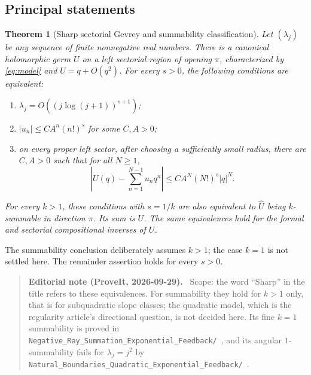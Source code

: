 \documentclass[11pt,a4paper]{article}
\numberwithin{equation}{section}
\newtheorem{theorem}{Theorem}[section]
\theoremstyle{definition}\newtheorem{definition}[theorem]{Definition}
\theoremstyle{remark}\newtheorem{remark}[theorem]{Remark}
\newcommand{\Uhat}{\widehat U}\newcommand{\Qhat}{\widehat Q}\newcommand{\Vhat}{\widehat V}
\newenvironment{ednote}{\par\smallskip\begin{quote}\small\raggedright\textbf{Editorial note (ProveIt, 2026-09-29).}\ }{\end{quote}\smallskip}
\begin{document}
\subsection{Principal statements}
\begin{theorem}[Sharp sectorial Gevrey and summability classification]
\label{thm:headline}
Let $(\lambda_j)$ be any sequence of finite nonnegative real numbers.
There is a canonical holomorphic germ $U$ on a left sectorial region of
opening $\pi$, characterized by \eqref{eq:model} and $U=q+O(q^2)$.
For every $s>0$, the following conditions are equivalent:
\begin{enumerate}[label=(\roman*)]
\item $\lambda_j=O((j\log(j+1))^{s+1})$;
\item $|u_n|\le CA^n(n!)^s$ for some $C,A>0$;
\item on every proper left sector, after choosing a sufficiently small
radius, there are $C,A>0$ such that for all $N\ge1$,
\begin{equation}
 \left|U(q)-\sum_{n=1}^{N-1}u_nq^n\right|
 \le CA^N(N!)^s|q|^N.
 \label{eq:headline-remainder}
\end{equation}
\end{enumerate}
For every $k>1$, these conditions with $s=1/k$ are also equivalent to
$\Uhat$ being $k$-summable in direction $\pi$. Its sum is $U$.
The same equivalences hold for the formal and sectorial compositional
inverses of $U$.
\end{theorem}
The summability conclusion deliberately assumes $k>1$; the case $k=1$
is not settled here. The remainder assertion holds for every $s>0$.
\begin{ednote}
Scope: the word ``Sharp'' in the title refers to these equivalences. For
summability they hold for $k>1$ only, that is for subquadratic slope
classes; the quadratic model, which is the regularity article's directional
question, is not decided here. Its fine $k=1$ summability is proved in
\nolinkurl{Negative_Ray_Summation_Exponential_Feedback/}~\cite{ed:negativeray}, and its angular $1$-summability fails for $\lambda_j=j^2$
by \nolinkurl{Natural_Boundaries_Quadratic_Exponential_Feedback/}~\cite{ed:naturalboundaries}.
\end{ednote}
\end{document}
